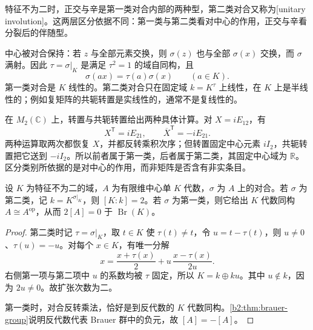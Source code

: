 特征不为二时，正交与辛是第一类对合内部的两种型，第二类对合又称为[unitary involution]。这两层区分依据不同：第一类与第二类看对中心的作用，正交与辛看分裂后的伴随型。

\ProseParagraphBreak
中心被对合保持：若 \(z\) 与全部元素交换，则 \(\sigma(z)\) 也与全部 \(\sigma(x)\) 交换，而 \(\sigma\) 满射。因此 \(\tau=\sigma|_K\) 是满足 \(\tau^2=1\) 的域自同构，且
\[
	\sigma(ax)=\tau(a)\sigma(x)\qquad(a\in K).
\]
第一类对合是 \(K\) 线性的。第二类对合只在固定域 \(k=K^\tau\) 上线性，在 \(K\) 上是半线性的；例如复矩阵的共轭转置是实线性的，通常不是复线性的。

\ProseParagraphBreak
在 \(M_2(\mathbb C)\) 上，转置与共轭转置给出两种具体计算。对 \(X=iE_{12}\)，有
\[
	X^{\mathsf T}=iE_{21},\qquad \overline X^{\mathsf T}=-iE_{21}.
\]
两种运算取两次都恢复 \(X\)，并都反转乘积次序；但转置固定中心元素 \(iI_2\)，共轭转置把它送到 \(-iI_2\)。所以前者属于第一类，后者属于第二类，其固定中心域为 \(\mathbb R\)。区分类别所依据的是对中心的作用，而非矩阵是否含有非实条目。

\begin{proposition}\label{b2:prop:B-involution-center}
	设 \(K\) 为特征不为二的域，\(A\) 为有限维中心单 \(K\) 代数，\(\sigma\) 为 \(A\) 上的对合。若 \(\sigma\) 为第二类，记 \(k=K^{\sigma|_K}\)，则 \([K:k]=2\)。若 \(\sigma\) 为第一类，则它给出 \(K\) 代数同构 \(A\cong A^{\mathrm{op}}\)，从而 \(2[A]=0\) 于 \(\operatorname{Br}(K)\)。
\end{proposition}
\begin{proof}
	第二类时记 \(\tau=\sigma|_K\)，取 \(t\in K\) 使 \(\tau(t)\ne t\)，令 \(u=t-\tau(t)\)，则 \(u\ne0\)、\(\tau(u)=-u\)。对每个 \(x\in K\)，有唯一分解
	\[
		x=\frac{x+\tau(x)}2+ u\,\frac{x-\tau(x)}{2u}.
	\]
	右侧第一项与第二项中 \(u\) 的系数均被 \(\tau\) 固定，所以 \(K=k\oplus ku\)。其中 \(u\notin k\)，因为 \(2u\ne0\)。故扩张次数为二。

	第一类时，对合反转乘法，恰好是到反代数的 \(K\) 代数同构。\cref{b2:thm:brauer-group}说明反代数代表 Brauer 群中的负元，故 \([A]=-[A]\)。
\end{proof}

